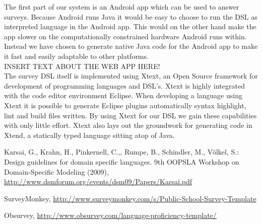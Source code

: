 \documentclass[runningheads]{llncs}
\begin{document}
The first part of our system is an Android app which can be used to answer surveys. Because Android runs Java it would be easy to choose to run the DSL as interpreted language in the Android app. This would on the other hand make the app slower on the computationally constrained hardware Android runs within. Instead we have chosen to generate native Java code for the Android app to make it fast and easily adaptable to other platforms.\\

INSERT TEXT ABOUT THE WEB APP HERE!\\

The survey DSL itself is implemented using Xtext, an Open Source framework for development of programming languages and DSL's. Xtext is highly integrated with the code editor environment Eclipse. When developing a language using Xtext it is possible to generate Eclipse plugins automatically syntax highlight, lint and build files written. By using Xtext for our DSL we gain these capabilities with only little effort. Xtext also lays out the groundwork for generating code in Xtend, a statically typed language sitting atop of Java.




\begin{thebibliography}{4}

 Karsai, G., Krahn, H., Pinkernell, C.,, Rumpe, B., Schindler, M., Völkel, S.: Design guidelines for domain specific languages. 
9th OOPSLA Workshop on Domain-Specific Modeling (2009), \url{http://www.dsmforum.org/events/dsm09/Papers/Karsai.pdf}

SurveyMonkey, \url{http://www.surveymonkey.com/s/Public-School-Survey-Template}

Obsurvey, \url{http://www.obsurvey.com/language-proficiency-template/}

\end{thebibliography}
\end{document}
